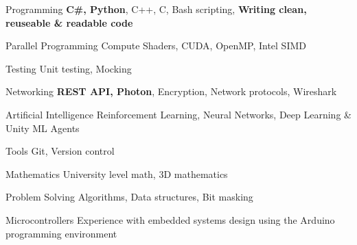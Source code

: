 

\begin{cvskills}

  \cvskill
    {Programming} %
    {\textbf{C\#, Python}, C++, C, Bash scripting, \textbf{Writing clean, reuseable \& readable code}} %
    
  \cvskill
    {Parallel Programming} %
    {Compute Shaders, CUDA, OpenMP, Intel SIMD} %

  \cvskill
    {Testing} %
    {Unit testing, Mocking} %

  \cvskill
    {Networking} %
    {\textbf{REST API, Photon}, Encryption, Network protocols, Wireshark}
    
    \cvskill
    {Artificial Intelligence} %
    {Reinforcement Learning, Neural Networks, Deep Learning \& Unity ML Agents} %

  \cvskill
    {Tools} %
    {Git, Version control} %
    
      
  \cvskill
    {Mathematics} %
    {University level math, 3D mathematics} %
    
  \cvskill
    {Problem Solving} %
    {Algorithms, Data structures, Bit masking} %

  \cvskill
    {Microcontrollers} %
    {Experience with embedded systems design using the Arduino programming environment} %



\end{cvskills}